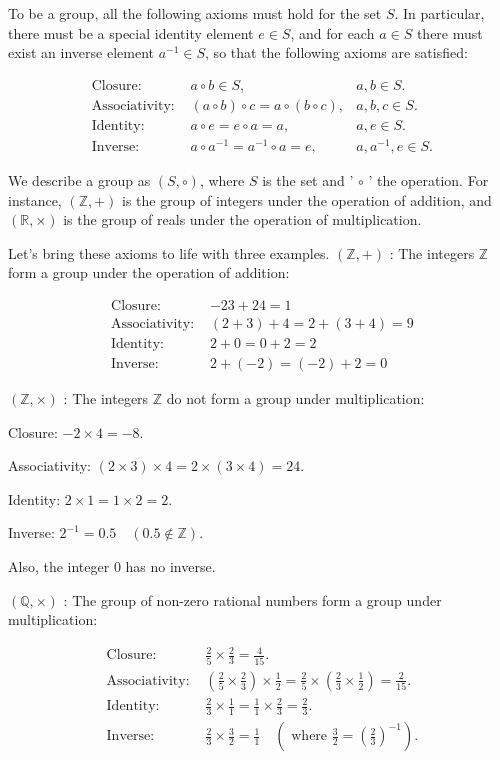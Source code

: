 \documentclass[10pt]{article}
\begin{document}
To be a group, all the following axioms must hold for the set $S$. In particular, there must be a special identity element $e \in S$, and for each $a \in S$ there must exist an inverse element $a^{-1} \in S$, so that the following axioms are satisfied:

$$
\begin{array}{rlr}
\text { Closure: } & a \circ b \in S, & a, b \in S . \\
\text { Associativity: } & (a \circ b) \circ c=a \circ(b \circ c), & a, b, c \in S . \\
\text { Identity: } & a \circ e=e \circ a=a, & a, e \in S . \\
\text { Inverse: } & a \circ a^{-1}=a^{-1} \circ a=e, & a, a^{-1}, e \in S .
\end{array}
$$

We describe a group as $(S, \circ)$, where $S$ is the set and ' $\circ$ ' the operation. For instance, $(\mathbb{Z},+)$ is the group of integers under the operation of addition, and $(\mathbb{R}, \times)$ is the group of reals under the operation of multiplication.

Let's bring these axioms to life with three examples. $(\mathbb{Z},+)$ : The integers $\mathbb{Z}$ form a group under the operation of addition:

$$
\begin{aligned}
\text { Closure: } & -23+24=1 \\
\text { Associativity: } & (2+3)+4=2+(3+4)=9 \\
\text { Identity: } & 2+0=0+2=2 \\
\text { Inverse: } & 2+(-2)=(-2)+2=0
\end{aligned}
$$

$(\mathbb{Z}, \times)$ : The integers $\mathbb{Z}$ do not form a group under multiplication:

Closure: $-2 \times 4=-8$.

Associativity: $(2 \times 3) \times 4=2 \times(3 \times 4)=24$.

Identity: $2 \times 1=1 \times 2=2$.

Inverse: $2^{-1}=0.5 \quad(0.5 \notin \mathbb{Z})$.

Also, the integer 0 has no inverse.

$(\mathbb{Q}, \times)$ : The group of non-zero rational numbers form a group under multiplication:

$$
\begin{aligned}
\text { Closure: } & \frac{2}{5} \times \frac{2}{3}=\frac{4}{15} . \\
\text { Associativity: } & \left(\frac{2}{5} \times \frac{2}{3}\right) \times \frac{1}{2}=\frac{2}{5} \times\left(\frac{2}{3} \times \frac{1}{2}\right)=\frac{2}{15} . \\
\text { Identity: } & \frac{2}{3} \times \frac{1}{1}=\frac{1}{1} \times \frac{2}{3}=\frac{2}{3} . \\
\text { Inverse: } & \frac{2}{3} \times \frac{3}{2}=\frac{1}{1} \quad\left(\text { where } \frac{3}{2}=\left(\frac{2}{3}\right)^{-1}\right) .
\end{aligned}
$$
\end{document}
